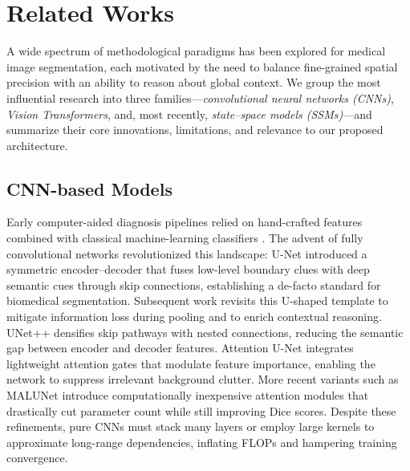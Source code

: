 \documentclass[conference]{IEEEtran}
\begin{document}
\section{Related Works}
A wide spectrum of methodological paradigms has been explored for medical image segmentation, each motivated by the need to balance fine-grained spatial precision with an ability to reason about global context.  We group the most influential research into three families—\emph{convolutional neural networks (CNNs)}, \emph{Vision Transformers}, and, most recently, \emph{state–space models (SSMs)}—and summarize their core innovations, limitations, and relevance to our proposed architecture.

\subsection{CNN-based Models}
Early computer-aided diagnosis pipelines relied on hand-crafted features combined with classical machine-learning classifiers \cite{27,28}. The advent of fully convolutional networks revolutionized this landscape: U-Net \cite{ronneberger2015} introduced a symmetric encoder–decoder that fuses low-level boundary clues with deep semantic cues through skip connections, establishing a de-facto standard for biomedical segmentation.  Subsequent work revisits this U-shaped template to mitigate information loss during pooling and to enrich contextual reasoning.  UNet++ \cite{zhou2018} densifies skip pathways with nested connections, reducing the semantic gap between encoder and decoder features.  Attention U-Net \cite{oktay2018} integrates lightweight attention gates that modulate feature importance, enabling the network to suppress irrelevant background clutter.  More recent variants such as MALUNet \cite{4} introduce computationally inexpensive attention modules that drastically cut parameter count while still improving Dice scores.  Despite these refinements, pure CNNs must stack many layers or employ large kernels to approximate long-range dependencies, inflating FLOPs and hampering training convergence.
\end{document}
